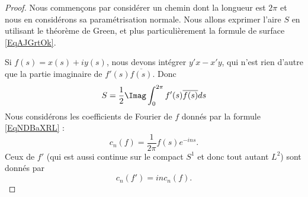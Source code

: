 \begin{proof}
    Nous commençons par considérer un chemin dont la longueur est \( 2\pi\) et nous en considérons sa paramétrisation normale. Nous allons exprimer l'aire \( S\) en utilisant le théorème de Green, et plus particulièrement la formule de surface \eqref{EqAJGrtOk}.

    Si \( f(s)=x(s)+iy(s)\), nous devons intégrer \( y'x-x'y\), qui n'est rien d'autre que la partie imaginaire de \( f'(s)\overline{ f(s) }\). Donc
    \begin{equation}    \label{EqCSWKbPX}
        S=\frac{ 1 }{2}\Imag\int_0^{2\pi}f'(s)\overline{ f(s) }ds
    \end{equation}
    Nous considérons les coefficients de Fourier de \( f\) donnés par la formule \eqref{EqNDBaXRL} :
    \begin{equation}
        c_n(f)=\frac{1}{ 2\pi }f(s) e^{-ins}.
    \end{equation}
    Ceux de \( f'\) (qui est aussi continue sur le compact \( S^1\) et donc tout autant \( L^2\)) sont donnés par
    \begin{equation}
        c_n(f')=inc_n(f).
    \end{equation}


\end{proof}
